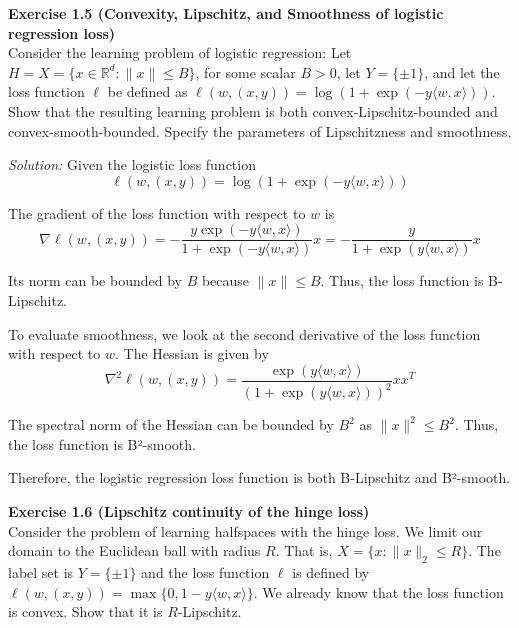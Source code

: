 \documentclass[
	10pt, %
	a4paper, %
	oneside, %
	headinclude,footinclude, %
	BCOR5mm, %
]{scrartcl}
\newenvironment{problem}[2][]
{ \begin{mdframed}[backgroundcolor=gray!20] \textbf{#1 #2} \\}
		{  \end{mdframed}}
\newenvironment{solution}
{\textit{Solution:}}
{}
\begin{document}
\begin{problem}{Exercise 1.5 (Convexity, Lipschitz, and Smoothness of logistic regression loss)}
Consider the learning problem of logistic regression: Let $H = X = \{x \in \mathbb{R}^d : \|x\| \leq B\}$, for some scalar $B > 0$, let $Y = \{\pm1\}$, and let the loss function $\ell$ be defined as $\ell(w, (x, y)) = \log(1 + \exp(-y\langle w, x \rangle))$. Show that the resulting learning problem is both convex-Lipschitz-bounded and convex-smooth-bounded. Specify the parameters of Lipschitzness and smoothness.
\end{problem}

\begin{solution}
	Given the logistic loss function
	\[\ell(w, (x, y)) = \log(1 + \exp(-y\langle w, x \rangle))\]

	The gradient of the loss function with respect to $w$ is
	\[\nabla \ell(w, (x, y)) = -\frac{y \exp(-y\langle w, x \rangle)}{1+\exp(-y\langle w, x \rangle)}x = -\frac{y}{1+\exp(y\langle w, x \rangle)}x\]

	Its norm can be bounded by $B$ because $\|x\| \leq B$. Thus, the loss function is B-Lipschitz.

	To evaluate smoothness, we look at the second derivative of the loss function with respect to $w$. The Hessian is given by
	\[\nabla^2 \ell(w, (x, y)) = \frac{\exp(y\langle w, x \rangle)}{(1+\exp(y\langle w, x \rangle))^2}xx^T\]

	The spectral norm of the Hessian can be bounded by $B^2$ as $\|x\|^2 \leq B^2$. Thus, the loss function is B²-smooth.

	Therefore, the logistic regression loss function is both B-Lipschitz and B²-smooth.
\end{solution}

\begin{problem}{Exercise 1.6 (Lipschitz continuity of the hinge loss)}
Consider the problem of learning halfspaces with the hinge loss. We limit our domain to the Euclidean ball with radius $R$. That is, $X = \{x : \|x\|_2 \leq R\}$. The label set is $Y = \{\pm1\}$ and the loss function $\ell$ is defined by $\ell(w, (x, y)) = \max\{0, 1 - y\langle w, x \rangle\}$. We already know that the loss function is convex. Show that it is $R$-Lipschitz.
\end{problem}
\end{document}
